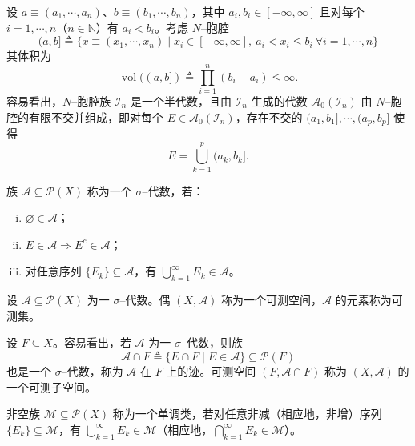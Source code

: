 \documentclass[../../main.tex]{subfiles}%
\begin{document}
\begin{example}\label{example:ch01-N胞腔}
设 $a\equiv(a_1,\cdots ,a_n)$、$b\equiv(b_1,\cdots ,b_n)$，其中 $a_i,b_i\in[-\infty,\infty]$ 且对每个 $i=1,\cdots ,n$（$n\in\mathbb{N}$）有 $a_i<b_i$。考虑 $N$--胞腔
\[
(a,b]\triangleq \{x\equiv(x_1,\cdots ,x_n)\mid x_i\in[-\infty,\infty],\ a_i<x_i\leqslant b_i\ \forall i=1,\cdots ,n\}
\]
其体积为
\[
\operatorname{vol}((a,b])\triangleq \prod_{i=1}^n(b_i-a_i)\leqslant\infty.
\]
容易看出，$N$--胞腔族 $\mathcal{I}_n$ 是一个半代数，且由 $\mathcal{I}_n$ 生成的代数 $\mathcal{A}_0(\mathcal{I}_n)$ 由 $N$--胞腔的有限不交并组成，即对每个 $E\in\mathcal{A}_0(\mathcal{I}_n)$，存在不交的 $(a_1,b_1],\cdots ,(a_p,b_p]$ 使得
\[
E=\bigcup_{k=1}^p(a_k,b_k].
\]
\end{example}

\begin{definition}\label{definition:ch01-sigma代数}
族 $\mathcal{A}\subseteq\mathcal{P}(X)$ 称为一个 $\sigma$--代数，若：
\begin{enumerate}[(i)]
\item $\varnothing \in\mathcal{A}$；
\item $E\in\mathcal{A}\Rightarrow E^c\in\mathcal{A}$；
\item 对任意序列 $\{E_k\}\subseteq\mathcal{A}$，有 $\bigcup_{k=1}^\infty E_k\in\mathcal{A}$。
\end{enumerate}
\end{definition}

\begin{definition}\label{definition:ch01-可测空间}
设 $\mathcal{A}\subseteq\mathcal{P}(X)$ 为一 $\sigma$--代数。偶 $(X,\mathcal{A})$ 称为一个可测空间，$\mathcal{A}$ 的元素称为可测集。
\end{definition}

\begin{remark}\label{remark:ch01-迹}
设 $F\subseteq X$。容易看出，若 $\mathcal{A}$ 为一 $\sigma$--代数，则族
\[
\mathcal{A}\cap F\triangleq \{E\cap F\mid E\in\mathcal{A}\}\subseteq\mathcal{P}(F)
\]
也是一个 $\sigma$--代数，称为 $\mathcal{A}$ 在 $F$ 上的迹。可测空间 $(F,\mathcal{A}\cap F)$ 称为 $(X,\mathcal{A})$ 的一个可测子空间。
\end{remark}

\begin{definition}\label{definition:ch01-单调类}
非空族 $\mathcal{M}\subseteq\mathcal{P}(X)$ 称为一个单调类，若对任意非减（相应地，非增）序列 $\{E_k\}\subseteq\mathcal{M}$，有 $\bigcup_{k=1}^\infty E_k\in\mathcal{M}$（相应地，$\bigcap_{k=1}^\infty E_k\in\mathcal{M}$）。
\end{definition}
\end{document}

